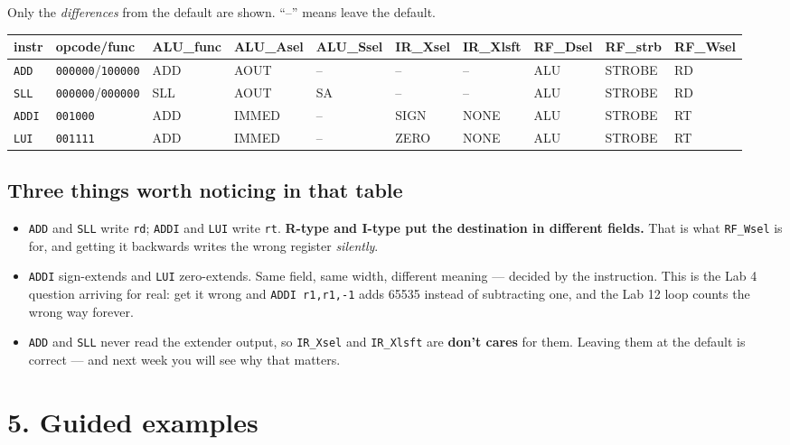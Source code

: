 \documentclass[11pt]{article}
\newcommand{\code}[1]{\texttt{#1}}
\begin{document}
Only the \emph{differences} from the default are shown. ``--'' means leave the
default.

\begin{center}
\small
\begin{tabular}{llllllllll}
\toprule
instr & opcode/func & ALU\_func & ALU\_Asel & ALU\_Ssel & IR\_Xsel & IR\_Xlsft & RF\_Dsel & RF\_strb & RF\_Wsel \\
\midrule
\code{ADD}  & \code{000000}/\code{100000} & ADD & AOUT & -- & -- & -- & ALU & STROBE & RD \\
\code{SLL}  & \code{000000}/\code{000000} & SLL & AOUT & SA & -- & -- & ALU & STROBE & RD \\
\code{ADDI} & \code{001000} & ADD & IMMED & -- & SIGN & NONE & ALU & STROBE & RT \\
\code{LUI}  & \code{001111} & ADD & IMMED & -- & ZERO & NONE & ALU & STROBE & RT \\
\bottomrule
\end{tabular}
\end{center}

\subsection*{Three things worth noticing in that table}

\begin{itemize}[leftmargin=1.6em,itemsep=2pt]
\item \code{ADD} and \code{SLL} write \code{rd}; \code{ADDI} and \code{LUI}
write \code{rt}. \textbf{R-type and I-type put the destination in different
fields.} That is what \code{RF\_Wsel} is for, and getting it backwards writes
the wrong register \emph{silently}.

\item \code{ADDI} sign-extends and \code{LUI} zero-extends. Same field, same
width, different meaning --- decided by the instruction. This is the Lab 4
question arriving for real: get it wrong and \code{ADDI r1,r1,-1} adds 65535
instead of subtracting one, and the Lab 12 loop counts the wrong way forever.

\item \code{ADD} and \code{SLL} never read the extender output, so
\code{IR\_Xsel} and \code{IR\_Xlsft} are \textbf{don't cares} for them. Leaving
them at the default is correct --- and next week you will see why that matters.
\end{itemize}

\section*{5. Guided examples}
\end{document}
